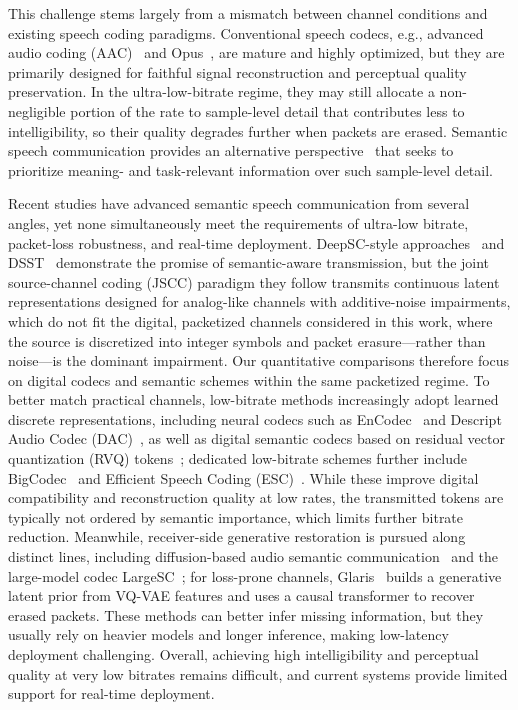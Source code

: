 \documentclass[lettersize,journal]{IEEEtran}
\begin{document}
This challenge stems largely from a mismatch between channel conditions and existing speech coding paradigms. Conventional speech codecs, e.g., advanced audio coding (AAC)~\cite{iso_aac} and Opus~\cite{valin2012opus}, are mature and highly optimized, but they are primarily designed for faithful signal reconstruction and perceptual quality preservation. In the ultra-low-bitrate regime, they may still allocate a non-negligible portion of the rate to sample-level detail that contributes less to intelligibility, so their quality degrades further when packets are erased. Semantic speech communication provides an alternative perspective~\cite{qin2021semcom,nguyen2025survey} that seeks to prioritize meaning- and task-relevant information over such sample-level detail.

Recent studies have advanced semantic speech communication from several angles, yet none simultaneously meet the requirements of ultra-low bitrate, packet-loss robustness, and real-time deployment. DeepSC-style approaches~\cite{weng2020deepscs,xie2021deepsc,weng2022deepscst} and DSST~\cite{xiao2023dsst} demonstrate the promise of semantic-aware transmission, but the joint source-channel coding (JSCC) paradigm they follow transmits continuous latent representations designed for analog-like channels with additive-noise impairments, which do not fit the digital, packetized channels considered in this work, where the source is discretized into integer symbols and packet erasure---rather than noise---is the dominant impairment. Our quantitative comparisons therefore focus on digital codecs and semantic schemes within the same packetized regime. To better match practical channels, low-bitrate methods increasingly adopt learned discrete representations, including neural codecs such as EnCodec~\cite{defossez2023encodec} and Descript Audio Codec (DAC)~\cite{kumar2023dac}, as well as digital semantic codecs based on residual vector quantization (RVQ) tokens~\cite{chen2025rvqgan}; dedicated low-bitrate schemes further include BigCodec~\cite{xin2024bigcodec} and Efficient Speech Coding (ESC)~\cite{gu2024esc}. While these improve digital compatibility and reconstruction quality at low rates, the transmitted tokens are typically not ordered by semantic importance, which limits further bitrate reduction. Meanwhile, receiver-side generative restoration is pursued along distinct lines, including diffusion-based audio semantic communication~\cite{rodriguez2024diffusion} and the large-model codec LargeSC~\cite{tian2025lsm}; for loss-prone channels, Glaris~\cite{han2025esc} builds a generative latent prior from VQ-VAE features and uses a causal transformer to recover erased packets. These methods can better infer missing information, but they usually rely on heavier models and longer inference, making low-latency deployment challenging. Overall, achieving high intelligibility and perceptual quality at very low bitrates remains difficult, and current systems provide limited support for real-time deployment.
\end{document}
